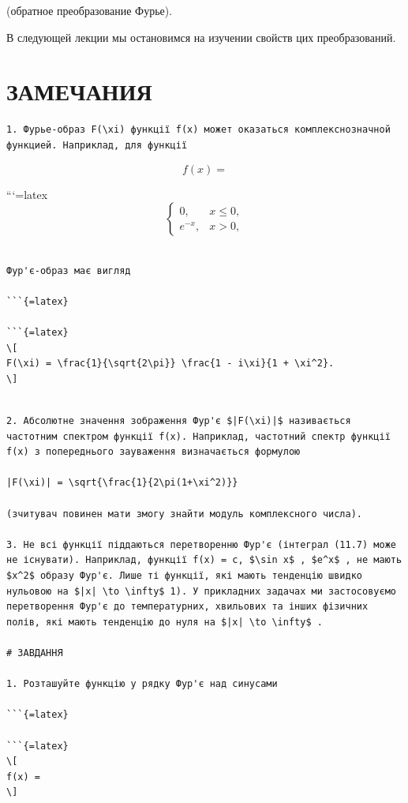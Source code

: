 \documentclass[
]{article}
\begin{document}
(обратное преобразование Фурье).

В следующей лекции мы остановимся на изучении свойств цих
преобразований.

\section{ЗАМЕЧАНИЯ}\label{ux437ux430ux43cux435ux447ux430ux43dux438ux44f}

\begin{verbatim}
1. Фурье-образ F(\xi) функції f(x) может оказаться комплекснозначной функцией. Наприклад, для функції
\end{verbatim}

\[
f(x) =
\]

```{=latex}
\[
\begin{cases} 0, & x \le 0, \\ e^{-x}, & x > 0, \end{cases}
\]

\begin{verbatim}

Фур'є-образ має вигляд

```{=latex}

```{=latex}
\[
F(\xi) = \frac{1}{\sqrt{2\pi}} \frac{1 - i\xi}{1 + \xi^2}.
\]
\end{verbatim}

\begin{verbatim}

2. Абсолютне значення зображення Фур'є $|F(\xi)|$ називається частотним спектром функції f(x). Наприклад, частотний спектр функції f(x) з попереднього зауваження визначається формулою

|F(\xi)| = \sqrt{\frac{1}{2\pi(1+\xi^2)}}

(зчитувач повинен мати змогу знайти модуль комплексного числа).

3. Не всі функції піддаються перетворенню Фур'є (інтеграл (11.7) може не існувати). Наприклад, функції f(x) = c, $\sin x$ , $e^x$ , не мають $x^2$ образу Фур'є. Лише ті функції, які мають тенденцію швидко нульовою на $|x| \to \infty$ 1). У прикладних задачах ми застосовуємо перетворення Фур'є до температурних, хвильових та інших фізичних полів, які мають тенденцію до нуля на $|x| \to \infty$ .

# ЗАВДАННЯ

1. Розташуйте функцію у рядку Фур'є над синусами

```{=latex}

```{=latex}
\[
f(x) =
\]
\end{verbatim}
\end{document}

